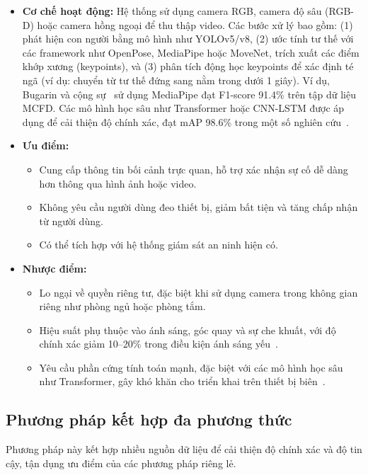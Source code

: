\begin{itemize}
    \item \textbf{Cơ chế hoạt động:} Hệ thống sử dụng camera RGB, camera độ sâu (RGB-D) hoặc camera hồng ngoại để thu thập video. Các bước xử lý bao gồm: (1) phát hiện con người bằng mô hình như YOLOv5/v8, (2) ước tính tư thế với các framework như OpenPose, MediaPipe hoặc MoveNet, trích xuất các điểm khớp xương (keypoints), và (3) phân tích động học keypoints để xác định té ngã (ví dụ: chuyển từ tư thế đứng sang nằm trong dưới 1 giây). Ví dụ, Bugarin và cộng sự~\cite{bugarin2022} sử dụng MediaPipe đạt F1-score 91.4\% trên tập dữ liệu MCFD. Các mô hình học sâu như Transformer hoặc CNN-LSTM được áp dụng để cải thiện độ chính xác, đạt mAP 98.6\% trong một số nghiên cứu~\cite{han2024}.
    \item \textbf{Ưu điểm:} 
    \begin{itemize}
        \item Cung cấp thông tin bối cảnh trực quan, hỗ trợ xác nhận sự cố dễ dàng hơn thông qua hình ảnh hoặc video.
        \item Không yêu cầu người dùng đeo thiết bị, giảm bất tiện và tăng chấp nhận từ người dùng.
        \item Có thể tích hợp với hệ thống giám sát an ninh hiện có.
    \end{itemize}
    \item \textbf{Nhược điểm:}
    \begin{itemize}
        \item Lo ngại về quyền riêng tư, đặc biệt khi sử dụng camera trong không gian riêng như phòng ngủ hoặc phòng tắm.
        \item Hiệu suất phụ thuộc vào ánh sáng, góc quay và sự che khuất, với độ chính xác giảm 10--20\% trong điều kiện ánh sáng yếu~\cite{saraswat2024}.
        \item Yêu cầu phần cứng tính toán mạnh, đặc biệt với các mô hình học sâu như Transformer, gây khó khăn cho triển khai trên thiết bị biên~\cite{stylios2024}.
    \end{itemize}
\end{itemize}

\subsection{Phương pháp kết hợp đa phương thức}

Phương pháp này kết hợp nhiều nguồn dữ liệu để cải thiện độ chính xác và độ tin cậy, tận dụng ưu điểm của các phương pháp riêng lẻ.

